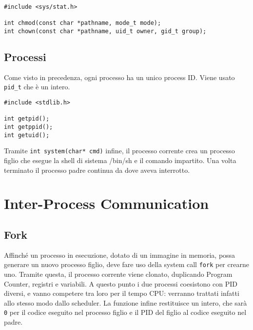 \documentclass[11pt]{article}
\begin{document}
\begin{verbatim}
#include <sys/stat.h>

int chmod(const char *pathname, mode_t mode);
int chown(const char *pathname, uid_t owner, gid_t group);
\end{verbatim}

\subsection{Processi}
Come visto in precedenza, ogni processo ha un unico process ID. Viene usato \verb|pid_t| che è un intero.

\begin{verbatim}
#include <stdlib.h>

int getpid();
int getppid();
int getuid();
\end{verbatim}

Tramite \verb|int system(char* cmd)| infine, il processo corrente crea un processo figlio che esegue la shell di sistema /bin/sh e il comando impartito. Una volta terminato il processo padre continua da dove aveva interrotto.

\section{Inter-Process Communication}

\subsection{Fork}

Affinché un processo in esecuzione, dotato di un immagine in memoria, possa generare un nuovo processo figlio, deve fare uso della system call \verb|fork| per crearne uno. Tramite questa, il processo corrente viene clonato, duplicando Program Counter, registri e variabili. A questo punto i due processi coesistono con PID diversi, e vanno competere tra loro per il tempo CPU: verranno trattati infatti allo stesso modo dallo scheduler. La funzione infine restituisce un intero, che sarà \verb|0| per il codice eseguito nel processo figlio e il PID del figlio al codice eseguito nel padre.
\end{document}
